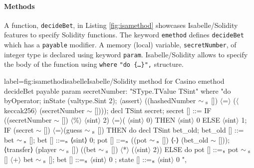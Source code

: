 \documentclass[a4paper,UKenglish,cleveref, autoref, thm-restate]{oasics-v2021}
\begin{document}
\paragraph*{Methods}
%
%
%
%
%
%
%
A function, \texttt{decideBet}, in Listing \ref{fig:isamethod} showcases Isabelle/Solidity features to specify Solidity functions.
%
The keyword \texttt{\color{isargreen}emethod} defines \texttt{decideBet} which has a \texttt{\color{isargreen}payable}  modifier. 
%
A memory (local) variable, \texttt{secretNumber}, of  integer type is declared using keyword  \texttt{\color{isargreen}param}.
%
Isabelle/Solidity allows to specify the body of the function using \texttt{\color{isargreen}where} \texttt{"do \{\dots\}",} structure.
%
%
\begin{code}{label={fig:isamethod}}{isabelle}{Isabelle/Solidity method for Casino}
emethod decideBet payable
  param secretNumber: "SType.TValue TSint"
where
  "do {
    byOperator;
    inState (valtype.Sint 2);
    $\langle$assert$\rangle$ ((hashedNumber $\sim\textsubscript{s}$ []) $\langle$=$\rangle$ ($\langle$keccak256$\rangle$ (secretNumber $\sim$ [])));
    decl TSint secret;
    secret [] ::= IF ((secretNumber $\sim$ []) $\langle\%\rangle$ $\langle$sint$\rangle$ 2) $\langle$=$\rangle$( $\langle$sint$\rangle$ 0) 
    					THEN $\langle$sint$\rangle$ 0 ELSE $\langle$sint$\rangle$ 1;
    IF (secret $\sim$ []) $\langle$=$\rangle$(guess $\sim\textsubscript{s}$ []) THEN
      do {
        decl TSint bet_old;
        bet_old [] ::= bet $\sim\textsubscript{s}$ [];
        bet [] ::=$\textsubscript{s}$ ⟨sint⟩ 0;
        pot [] ::=$\textsubscript{s}$ ((pot $\sim\textsubscript{s}$ []) ⟨-⟩ (bet_old $\sim$ []));
        ⟨transfer⟩ (player $\sim\textsubscript{s}$ []) ((bet $\sim\textsubscript{s}$ []) $\langle$*$\rangle$ ($\langle$sint$\rangle$ 2))
      }
     ELSE
      do {
        pot [] ::=$\textsubscript{s}$ pot $\sim\textsubscript{s}$ [] $\langle$+$\rangle$ bet $\sim\textsubscript{s}$ [];
        bet [] ::=$\textsubscript{s}$ $\langle$sint$\rangle$ 0
      };
     state [] ::=$\textsubscript{s}$ $\langle$sint$\rangle$ 0
  }",
\end{code}
\end{document}
